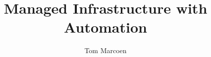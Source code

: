 \usepackage[margin=3cm,right=6cm]{geometry}
\usepackage[utf8]{inputenc}
\usepackage[T1]{fontenc}
\usepackage[mono=false,osf]{libertine}
\usepackage[scaled=0.82]{beramono}
\usepackage[pdfencoding=auto]{hyperref}
\usepackage{bookmark} %

\newcommand*{\abbr}[1]{%
   \texorpdfstring{\textsc{\MakeLowercase{#1}}}{#1}%
}

\title{Managed Infrastructure with Automation}
\author{Tom Marcoen}